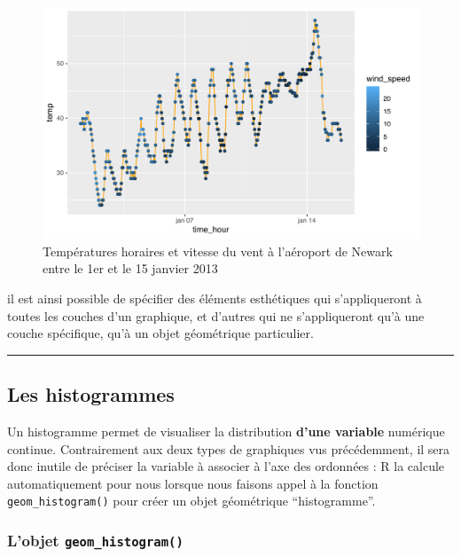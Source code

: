 \documentclass[a4paperpaper,]{article}
\theoremstyle{definition}
\theoremstyle{definition}
\theoremstyle{definition}
\theoremstyle{remark}
\begin{document}
\begin{figure}[htpb]

{\centering \includegraphics[width=0.9\linewidth]{figure/wind4-1} 

}

\caption{Températures horaires et vitesse du vent à l'aéroport de Newark entre le 1er et le 15 janvier 2013}\label{fig:wind4}
\end{figure}

il est ainsi possible de spécifier des éléments esthétiques qui
s'appliqueront à toutes les couches d'un graphique, et d'autres qui ne
s'appliqueront qu'à une couche spécifique, qu'à un objet géométrique
particulier.

\begin{center}\rule{0.5\linewidth}{\linethickness}\end{center}

\subsection{Les histogrammes}\label{histogram}

Un histogramme permet de visualiser la distribution \textbf{d'une
variable} numérique continue. Contrairement aux deux types de graphiques
vus précédemment, il sera donc inutile de préciser la variable à
associer à l'axe des ordonnées : R la calcule automatiquement pour nous
lorsque nous faisons appel à la fonction \texttt{geom\_histogram()} pour
créer un objet géométrique ``histogramme''.

\subsubsection{\texorpdfstring{L'objet
\texttt{geom\_histogram()}}{L'objet geom\_histogram()}}\label{lobjet-geom_histogram}
\end{document}
